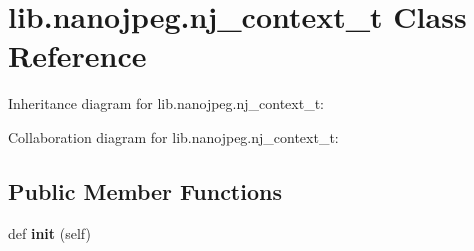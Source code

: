 \hypertarget{classlib_1_1nanojpeg_1_1nj__context__t}{}\section{lib.\+nanojpeg.\+nj\+\_\+context\+\_\+t Class Reference}
\label{classlib_1_1nanojpeg_1_1nj__context__t}


Inheritance diagram for lib.\+nanojpeg.\+nj\+\_\+context\+\_\+t\+:


Collaboration diagram for lib.\+nanojpeg.\+nj\+\_\+context\+\_\+t\+:
\subsection*{Public Member Functions}
\begin{DoxyCompactItemize}
\item 
\mbox{\label{classlib_1_1nanojpeg_1_1nj__context__t_a3b0b3c745eca3cb7fc1127f843ed3a53}} 
def {\bfseries init} (self)
\end{DoxyCompactItemize}

